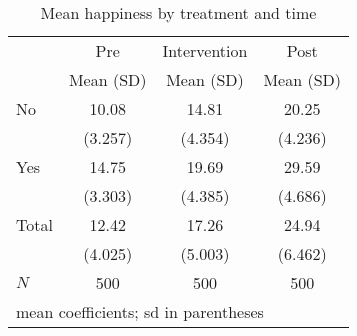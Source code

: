 \begin{table}[htbp]\centering
\caption{Mean happiness by treatment and time}
\begin{tabular}{l*{3}{c}}
\hline\hline
            &\multicolumn{1}{c}{Pre}&\multicolumn{1}{c}{Intervention}&\multicolumn{1}{c}{Post}\\
            &   Mean (SD)&   Mean (SD)&   Mean (SD)\\
\hline
No          &       10.08&       14.81&       20.25\\
            &     (3.257)&     (4.354)&     (4.236)\\
[1em]
Yes         &       14.75&       19.69&       29.59\\
            &     (3.303)&     (4.385)&     (4.686)\\
[1em]
Total       &       12.42&       17.26&       24.94\\
            &     (4.025)&     (5.003)&     (6.462)\\
\hline
\(N\)       &         500&         500&         500\\
\hline\hline
\multicolumn{4}{l}{\footnotesize mean coefficients; sd in parentheses}\\
\end{tabular}
\end{table}
